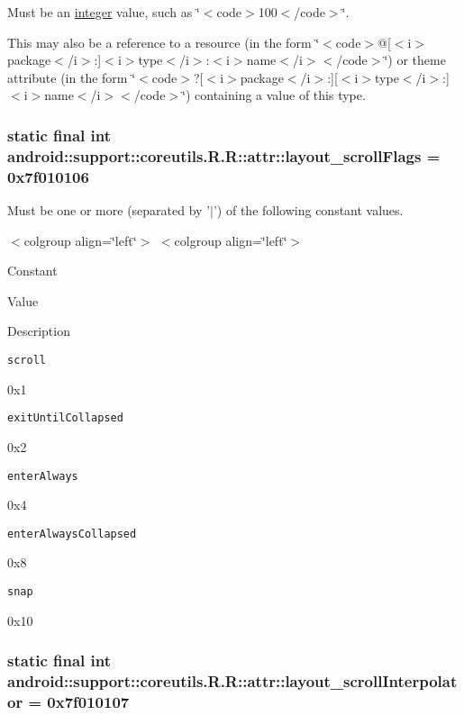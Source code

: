 Must be an \hyperlink{classandroid_1_1support_1_1coreutils_1_1_r_1_1integer}{integer} value, such as \char`\"{}$<$code$>$100$<$/code$>$\char`\"{}. 

This may also be a reference to a resource (in the form \char`\"{}$<$code$>$@\mbox{[}$<$i$>$package$<$/i$>$:\mbox{]}$<$i$>$type$<$/i$>$:$<$i$>$name$<$/i$>$$<$/code$>$\char`\"{}) or theme attribute (in the form \char`\"{}$<$code$>$?\mbox{[}$<$i$>$package$<$/i$>$:\mbox{]}\mbox{[}$<$i$>$type$<$/i$>$:\mbox{]}$<$i$>$name$<$/i$>$$<$/code$>$\char`\"{}) containing a value of this type. \hypertarget{classandroid_1_1support_1_1coreutils_1_1_r_1_1attr_ef7a62f1aa2fd867e6fd3c211fb8ad67}{
\subsubsection[{layout\_\-scrollFlags}]{\setlength{\rightskip}{0pt plus 5cm}static final int android::support::coreutils.R.R::attr::layout\_\-scrollFlags = 0x7f010106}}
\label{classandroid_1_1support_1_1coreutils_1_1_r_1_1attr_ef7a62f1aa2fd867e6fd3c211fb8ad67}


Must be one or more (separated by '$|$') of the following constant values. \begin{TabularC}{0}
\hline
\end{TabularC}
$<$colgroup align=\char`\"{}left\char`\"{}$>$ $<$colgroup align=\char`\"{}left\char`\"{}$>$ 

Constant

Value

Description 

{\tt scroll}

0x1

{\tt exitUntilCollapsed}

0x2

{\tt enterAlways}

0x4

{\tt enterAlwaysCollapsed}

0x8

{\tt snap}

0x10\hypertarget{classandroid_1_1support_1_1coreutils_1_1_r_1_1attr_ada22b95ac4b8990e5b6bd26dae9283e}{
\subsubsection[{layout\_\-scrollInterpolator}]{\setlength{\rightskip}{0pt plus 5cm}static final int android::support::coreutils.R.R::attr::layout\_\-scrollInterpolator = 0x7f010107}}
\label{classandroid_1_1support_1_1coreutils_1_1_r_1_1attr_ada22b95ac4b8990e5b6bd26dae9283e}


